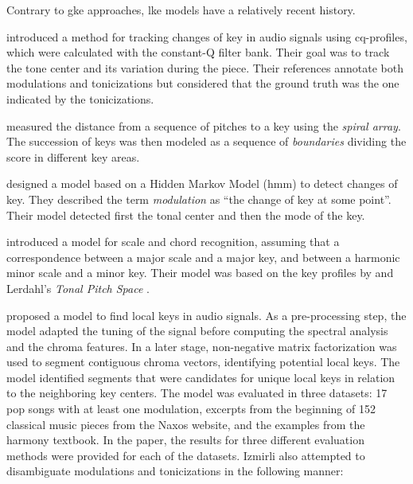 


Contrary to \gls{gke} approaches, \gls{lke} models have a relatively recent history.

\textcite{purwins2000new} introduced a method for tracking
changes of key in audio signals using cq-profiles, which
were calculated with the constant-Q filter bank. Their goal
was to track the tone center and its variation during the
piece. Their references annotate both modulations and
tonicizations but considered that the ground truth was the
one indicated by the tonicizations.

\textcite{chew2002spiral} measured the distance from a
sequence of pitches to a key using the \emph{spiral array}.
The succession of keys was then modeled as a sequence of
\emph{boundaries} dividing the score in different key areas.

\textcite{chai2005detection} designed a model based on a
Hidden Markov Model (\gls{hmm}) to detect changes of key.
They described the term \emph{modulation} as ``the change of
key at some point''. Their model detected first the tonal
center and then the mode of the key.

\textcite{catteau2007probabilistic} introduced a model for
scale and chord recognition, assuming that a correspondence
between a major scale and a major key, and between a
harmonic minor scale and a minor key. Their model was based
on the key profiles by \textcite{temperley1999whats} and
Lerdahl's \emph{Tonal Pitch Space}
\parencite{lerdahl2005tonal}.

\textcite{izmirli2007localized} proposed a model to find
local keys in audio signals. As a pre-processing step, the
model adapted the tuning of the signal before computing the
spectral analysis and the chroma features. In a later stage,
non-negative matrix factorization was used to segment
contiguous chroma vectors, identifying potential local keys.
The model identified segments that were candidates for
unique local keys in relation to the neighboring key
centers. The model was evaluated in three datasets: 17 pop
songs with at least one modulation, excerpts from the
beginning of 152 classical music pieces from the Naxos
website, and the examples from the
\textcite{kostka1984tonal} harmony textbook. In the paper,
the results for three different evaluation methods were
provided for each of the datasets. Izmirli also attempted to
disambiguate modulations and tonicizations in the following
manner:

